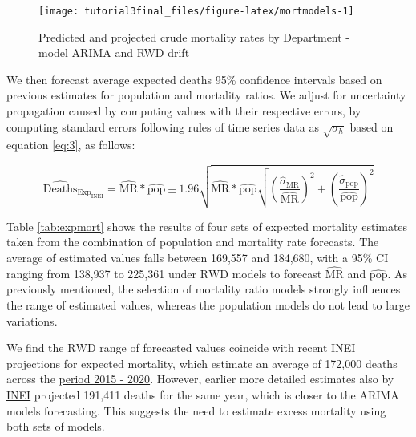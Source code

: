 \documentclass[
]{article}
\begin{document}
\begin{figure}[H]

{\centering \texttt{[image: tutorial3final\_files/figure-latex/mortmodels-1]} 

}

\caption{ Predicted and projected crude mortality rates by Department - model ARIMA and RWD drift}\label{fig:mortmodels}
\end{figure}

We then forecast average expected deaths 95\% confidence intervals based on previous estimates for population and mortality ratios. We adjust for uncertainty propagation caused by computing values with their respective errors, by computing standard errors following rules of time series data as \(\sqrt{\sigma_{h}}\) based on equation \eqref{eq:3}, as follows:

\begin{equation}
   \label{eq:4}
  \widehat{\text{Deaths}}_{\text{Exp}_\text{INEI}}= \widehat{\text{MR}} * \widehat{\text{pop}} \pm
   1.96\sqrt{\widehat{\text{MR}}*\widehat{\text{pop}}
   \sqrt{(\frac{\hat{\sigma}_\text{MR}}{\widehat{\text{MR}}})^2+
   (\frac{\hat{\sigma}_\text{pop}}{\widehat{\text{pop}}})^2}}
\end{equation}

Table \ref{tab:expmort} shows the results of four sets of expected mortality estimates taken from the combination of population and mortality rate forecasts. The average of estimated values falls between 169,557 and 184,680, with a 95\% CI ranging from 138,937 to 225,361 under \(\text{RWD}\) models to forecast \(\widehat{\text{MR}}\) and \(\widehat{\text{pop}}\). As previously mentioned, the selection of mortality ratio models strongly influences the range of estimated values, whereas the population models do not lead to large variations.

We find the \(\text{RWD}\) range of forecasted values coincide with recent INEI projections for expected mortality, which estimate an average of 172,000 deaths across the \href{https://www.inei.gob.pe/media/MenuRecursivo/publicaciones_digitales/Est/Lib1665/libro.pdf}{period 2015 - 2020}. However, earlier more detailed estimates also by \href{http://webapp.inei.gob.pe:8080/sirtod-series/}{INEI} projected 191,411 deaths for the same year, which is closer to the \(\text{ARIMA}\) models forecasting. This suggests the need to estimate excess mortality using both sets of models.
\end{document}
